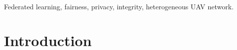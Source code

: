 \documentclass[lettersize,journal]{IEEEtran}
\begin{document}
\begin{abstract}

\end{abstract}

\begin{IEEEkeywords}
Federated learning, fairness, privacy, integrity, heterogeneous UAV network.
\end{IEEEkeywords}

\section{Introduction}
\end{document}
